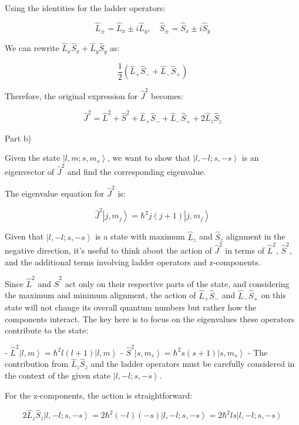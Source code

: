Using the identities for the ladder operators:

\[
\hat{L}_{\pm} = \hat{L}_{x} \pm i\hat{L}_{y}, \quad \hat{S}_{\pm} = \hat{S}_{x} \pm i\hat{S}_{y}
\]

We can rewrite \( \hat{L}_{x}\hat{S}_{x} + \hat{L}_{y}\hat{S}_{y} \) as:

\[
\frac{1}{2}(\hat{L}_{+}\hat{S}_{-} + \hat{L}_{-}\hat{S}_{+})
\]

Therefore, the original expression for \( \hat{J}^2 \) becomes:

\[
\hat{J}^2 = \hat{L}^2 + \hat{S}^2 + \hat{L}_{+}\hat{S}_{-} + \hat{L}_{-}\hat{S}_{+} + 2\hat{L}_{z}\hat{S}_{z}
\]

Part b)

Given the state \( \left|l, m; s, m_{s} \right> \), we want to show that \( \left|l, -l; s, -s \right> \) is an eigenvector of \( \hat{J}^2 \) and find the corresponding eigenvalue.

The eigenvalue equation for \( \hat{J}^2 \) is:

\[
\hat{J}^2\left|j, m_j \right> = \hbar^2 j(j+1)\left|j, m_j \right>
\]

Given that \( \left|l, -l; s, -s \right> \) is a state with maximum \( \hat{L}_{z} \) and \( \hat{S}_{z} \) alignment in the negative direction, it's useful to think about the action of \( \hat{J}^2 \) in terms of \( \hat{L}^2 \), \( \hat{S}^2 \), and the additional terms involving ladder operators and z-components.

Since \( \hat{L}^2 \) and \( \hat{S}^2 \) act only on their respective parts of the state, and considering the maximum and minimum alignment, the action of \( \hat{L}_{+}\hat{S}_{-} \) and \( \hat{L}_{-}\hat{S}_{+} \) on this state will not change its overall quantum numbers but rather how the components interact. The key here is to focus on the eigenvalues these operators contribute to the state:

- \( \hat{L}^2 \left|l, m \right> = \hbar^2 l(l+1) \left|l, m \right> \)
- \( \hat{S}^2 \left|s, m_s \right> = \hbar^2 s(s+1) \left|s, m_s \right> \)
- The contribution from \( \hat{L}_{z}\hat{S}_{z} \) and the ladder operators must be carefully considered in the context of the given state \( \left|l, -l; s, -s \right> \).

For the z-components, the action is straightforward:

\[
2\hat{L}_{z}\hat{S}_{z}\left|l, -l; s, -s \right> = 2\hbar^2 (-l)(-s)\left|l, -l; s, -s \right> = 2\hbar^2 ls\left|l, -l; s, -s \right>
\]

